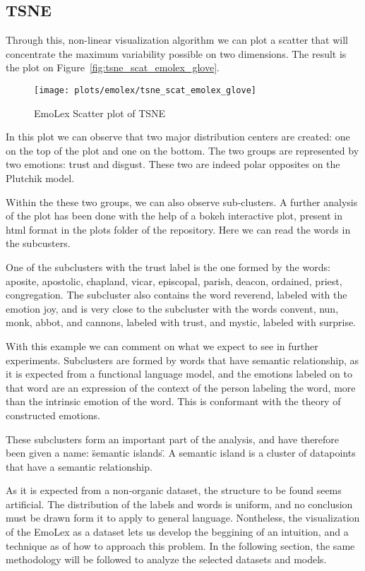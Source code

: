 \subsection{TSNE}
Through this, non-linear visualization algorithm we can plot a scatter that will concentrate the maximum variability possible on two dimensions. The result is the plot on Figure~\ref{fig:tsne_scat_emolex_glove}.

\begin{figure}[H]
  \texttt{[image: plots/emolex/tsne\_scat\_emolex\_glove]}
  \centering
  \caption{EmoLex Scatter plot of TSNE}
\end{figure}\label{fig:tsne_scat_emolex_glove}

In this plot we can observe that two major distribution centers are created: one on the top of the plot and one on the bottom. The two groups are represented by two emotions: trust and disgust. These two are indeed polar opposites on the Plutchik model.

Within the these two groups, we can also observe sub-clusters. A further analysis of the plot has been done with the help of a bokeh interactive plot, present in html format in the plots folder of the repository. Here we can read the words in the subcusters.

One of the subclusters with the trust label is the one formed by the words: aposite, apostolic, chapland, vicar, episcopal, parish, deacon, ordained, priest, congregation. The subcluster also contains the word reverend, labeled with the emotion joy, and is very close to the subcluster with the words convent, nun, monk, abbot, and cannons, labeled with trust, and mystic, labeled with surprise.

With this example we can comment on what we expect to see in further experiments. Subclusters are formed by words that have semantic relationship, as it is expected from a functional language model, and the emotions labeled on to that word are an expression of the context of the person labeling the word, more than the intrinsic emotion of the word. This is conformant with the theory of constructed emotions.

These subclusters form an important part of the analysis, and have therefore been given a name: \"semantic islands\". A semantic island is a cluster of datapoints that have a semantic relationship.

As it is expected from a non-organic dataset, the structure to be found seems artificial. The distribution of the labels and words is uniform, and no conclusion must be drawn form it to apply to general language. Nontheless, the visualization of the EmoLex as a dataset lets us develop the beggining of an intuition, and a technique as of how to approach this problem. In the following section, the same methodology will be followed to analyze the selected datasets and models.



